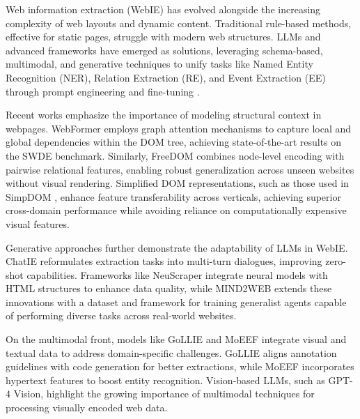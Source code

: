 \documentclass[a4paper]{article}
\begin{document}
Web information extraction (WebIE) has evolved alongside the increasing complexity of web layouts and dynamic content. Traditional rule-based methods, effective for static pages, struggle with modern web structures. LLMs and advanced frameworks have emerged as solutions, leveraging schema-based, multimodal, and generative techniques to unify tasks like Named Entity Recognition (NER), Relation Extraction (RE), and Event Extraction (EE) through prompt engineering and fine-tuning \cite{xu2024largelanguagemodelsgenerative}.

Recent works emphasize the importance of modeling structural context in webpages. WebFormer \cite{wang2022webformerwebpagetransformerstructure} employs graph attention mechanisms to capture local and global dependencies within the DOM tree, achieving state-of-the-art results on the SWDE benchmark. Similarly, FreeDOM \cite{DBLP:journals/corr/abs-2010-10755} combines node-level encoding with pairwise relational features, enabling robust generalization across unseen websites without visual rendering. Simplified DOM representations, such as those used in SimpDOM \cite{zhou2021simplifieddomtreestransferable}, enhance feature transferability across verticals, achieving superior cross-domain performance while avoiding reliance on computationally expensive visual features.

Generative approaches further demonstrate the adaptability of LLMs in WebIE. ChatIE \cite{wei2024chatie} reformulates extraction tasks into multi-turn dialogues, improving zero-shot capabilities. Frameworks like NeuScraper \cite{ahluwalia2024leveraginglargelanguagemodels} integrate neural models with HTML structures to enhance data quality, while MIND2WEB \cite{deng2023mind2webgeneralistagentweb} extends these innovations with a dataset and framework for training generalist agents capable of performing diverse tasks across real-world websites.

On the multimodal front, models like GoLLIE \cite{sainz2024gollieannotationguidelinesimprove} and MoEEF \cite{yang2024hypertextentityextractionwebpage} integrate visual and textual data to address domain-specific challenges. GoLLIE aligns annotation guidelines with code generation for better extractions, while MoEEF incorporates hypertext features to boost entity recognition. Vision-based LLMs, such as GPT-4 Vision\cite{fellman-etal-2024-future}, highlight the growing importance of multimodal techniques for processing visually encoded web data.
\end{document}
